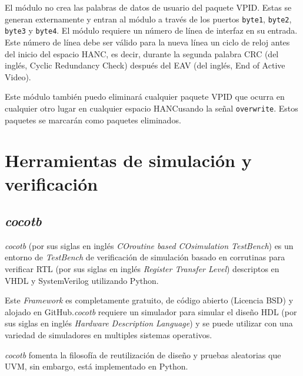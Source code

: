 El módulo no crea las palabras de datos de usuario del paquete VPID\@. Estas se
generan externamente y entran al módulo a través de los puertos \texttt{byte1},
\texttt{byte2}, \texttt{byte3} y \texttt{byte4}. El módulo requiere un número
de línea de interfaz en su entrada. Este número de línea debe ser válido para
la nueva línea un ciclo de reloj antes del inicio del espacio HANC, es decir,
durante la segunda palabra CRC  (del inglés, Cyclic Redundancy Check) después del EAV  (del inglés, End of Active Video)\@.

Este módulo también puedo eliminará cualquier paquete VPID que ocurra en
cualquier otro lugar en cualquier espacio HANC\@ usando la señal
\texttt{overwrite}. Estos paquetes se marcarán como paquetes eliminados. 




\section{Herramientas de simulación y verificación}

\subsection{\textit{cocotb}}

  \textit{cocotb} (por sus siglas en inglés \textit{COroutine based COsimulation
  TestBench}) es un entorno de \textit{TestBench} de verificación de simulación
  basado en corrutinas para verificar RTL (por sus siglas en inglés
  \textit{Register Transfer Level}) descriptos en VHDL y SystemVerilog utilizando
  Python.

  Este \textit{Framework} es completamente gratuito, de código abierto (Licencia
  BSD) y alojado en GitHub.\textit{cocotb} requiere un simulador para simular el
  diseño HDL (por sus siglas en inglés \textit{Hardware Description Language}) y
  se puede utilizar con una variedad de simuladores en multiples sistemas
  operativos.

  \textit{cocotb} fomenta la filosofía de reutilización de diseño y pruebas
  aleatorias que UVM, sin embargo, está implementado en Python.

